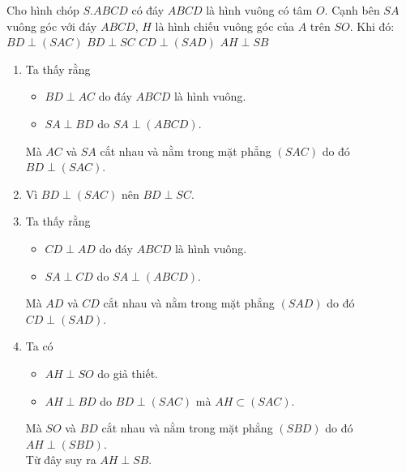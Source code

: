 \begin{ex}%
Cho hình chóp $S.ABCD$ có đáy $ABCD$ là hình vuông có tâm $O$. Cạnh bên $SA$ vuông góc với đáy $ABCD$, $H$ là hình chiếu vuông góc của $A$ trên $SO$. Khi đó:
\choiceTF
{\True $BD\perp(SAC)$}
{\True $BD\perp SC$}
{\True $CD\perp (SAD)$}
{\True $AH\perp SB$}
\loigiai
{
\begin{center}
\end{center}
\begin{enumerate}
\item Ta thấy rằng
\begin{itemize}
\item $BD\perp AC$ do đáy $ABCD$ là hình vuông.
\item $SA\perp BD$ do $SA\perp(ABCD)$.
\end{itemize}
Mà $AC$ và $SA$ cắt nhau và nằm trong mặt phẳng $(SAC)$ do đó $BD\perp (SAC)$.
\item Vì $BD\perp (SAC)$ nên $BD\perp SC$.
\item Ta thấy rằng
\begin{itemize}
\item $CD\perp AD$ do đáy $ABCD$ là hình vuông.
\item $SA\perp CD$ do $SA\perp(ABCD)$.
\end{itemize}
Mà $AD$ và $CD$ cắt nhau và nằm trong mặt phẳng $(SAD)$ do đó $CD\perp (SAD)$.
\item Ta có
\begin{itemize}
\item $AH\perp SO$ do giả thiết.
\item $AH\perp BD$ do $BD\perp(SAC)$ mà $AH\subset (SAC)$.
\end{itemize}
Mà $SO$ và $BD$ cắt nhau và nằm trong mặt phẳng $(SBD)$ do đó $AH\perp (SBD)$.\\
Từ đây suy ra $AH\perp SB$.
\end{enumerate}
}
\end{ex}

